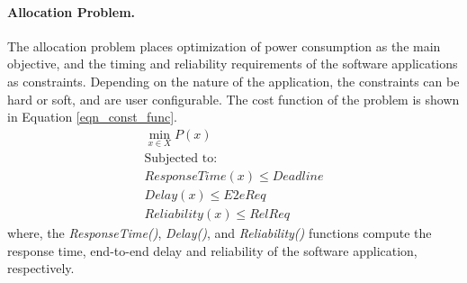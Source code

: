 \paragraph{Allocation Problem. } The allocation problem places optimization of power consumption as the main objective, and the timing and reliability requirements of the software applications as constraints. Depending on the nature of the application, the constraints can be hard or soft, and are user configurable. The cost function of the problem is shown in Equation \ref{eqn_const_func}.
\begin{align}
\label{eqn_const_func}
\min_{x\in X} P(x) \\
\text{Subjected to:}\nonumber\\
\label{lbl_deadline_constraint} 
ResponseTime(x) \leq Deadline\\ 
\label{lbl_e2e_constraint}
Delay(x) \leq E2eReq \\
\label{lbl_reliability_constraint}
Reliability(x) \leq RelReq
\end{align}
where, the \textit{ResponseTime()}, \textit{Delay()}, and \textit{Reliability()} functions compute the response time, end-to-end delay and reliability of the software application, respectively.

